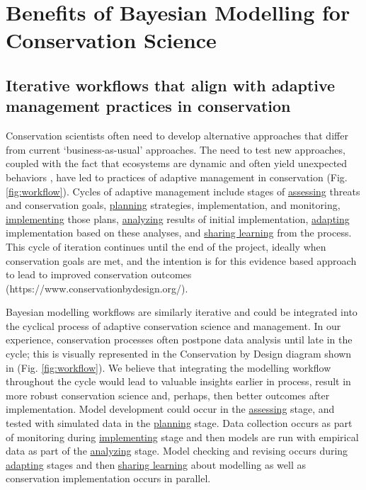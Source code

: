 \documentclass{article}
\begin{document}
\section* {Benefits of Bayesian Modelling for Conservation Science}
\subsection*{Iterative workflows that align with adaptive management practices in conservation}
\par Conservation scientists often need to develop alternative approaches that differ from current `business-as-usual' approaches. The need to test new approaches, coupled with the fact that ecosystems are dynamic and often yield unexpected behaviors \citep{Levin2012,Gross2013}, have led to practices of adaptive management in conservation  \citep{holling1978adaptive} (Fig. \ref{fig:workflow}). Cycles of adaptive management include stages of \underline{assessing} threats and conservation goals, \underline{planning} strategies, implementation, and monitoring, \underline{implementing} those plans, \underline{analyzing} results of initial implementation, \underline{adapting} implementation based on these analyses, and \underline{sharing learning} from the process. This cycle of iteration continues until the end of the project, ideally when conservation goals are met, and the intention is for this evidence based approach to lead to improved conservation outcomes (https://www.conservationbydesign.org/).

\par Bayesian modelling workflows are similarly iterative and could be integrated into the cyclical process of adaptive conservation science and management. In our experience, conservation processes often postpone data analysis until late in the cycle; this is visually represented in the Conservation by Design diagram shown in (Fig. \ref{fig:workflow}). We believe that integrating the modelling workflow throughout the cycle would lead to valuable insights earlier in process, result in more robust conservation science and, perhaps, then better outcomes after implementation. Model development could occur in the \underline{assessing} stage, and tested with simulated data in the \underline{planning} stage. Data collection occurs as part of monitoring during \underline{implementing} stage and then models are run with empirical data as part of the \underline{analyzing} stage. Model checking and revising occurs during \underline{adapting} stages and then \underline{sharing learning} about modelling as well as conservation implementation occurs in parallel.  
\end{document}
